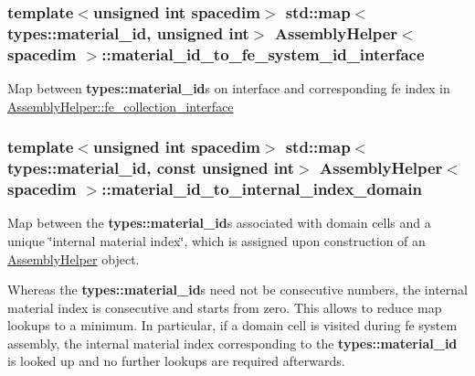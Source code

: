 \subsubsection[{\texorpdfstring{material\+\_\+id\+\_\+to\+\_\+fe\+\_\+system\+\_\+id\+\_\+interface}{material_id_to_fe_system_id_interface}}]{\setlength{\rightskip}{0pt plus 5cm}template$<$unsigned int spacedim$>$ std\+::map$<${\bf types\+::material\+\_\+id}, unsigned int$>$ {\bf Assembly\+Helper}$<$ spacedim $>$\+::material\+\_\+id\+\_\+to\+\_\+fe\+\_\+system\+\_\+id\+\_\+interface\hspace{0.3cm}{\ttfamily [private]}}\hypertarget{class_assembly_helper_a5fea54137e3c1c5a514e39c9b2ad7926}{}\label{class_assembly_helper_a5fea54137e3c1c5a514e39c9b2ad7926}
Map between {\bf types\+::material\+\_\+id}s on interface and corresponding fe index in \hyperlink{class_assembly_helper_a8b4d224a9ecd2e926a8860829874d2a1}{Assembly\+Helper\+::fe\+\_\+collection\+\_\+interface} 
\subsubsection[{\texorpdfstring{material\+\_\+id\+\_\+to\+\_\+internal\+\_\+index\+\_\+domain}{material_id_to_internal_index_domain}}]{\setlength{\rightskip}{0pt plus 5cm}template$<$unsigned int spacedim$>$ std\+::map$<${\bf types\+::material\+\_\+id}, const unsigned int$>$ {\bf Assembly\+Helper}$<$ spacedim $>$\+::material\+\_\+id\+\_\+to\+\_\+internal\+\_\+index\+\_\+domain\hspace{0.3cm}{\ttfamily [private]}}\hypertarget{class_assembly_helper_a10b3acf64bccc169ee14dc2505ce4b46}{}\label{class_assembly_helper_a10b3acf64bccc169ee14dc2505ce4b46}
Map between the {\bf types\+::material\+\_\+id}s associated with domain cells and a unique \char`\"{}internal material index\char`\"{}, which is assigned upon construction of an \hyperlink{class_assembly_helper}{Assembly\+Helper} object.

Whereas the {\bf types\+::material\+\_\+id}s need not be consecutive numbers, the internal material index is consecutive and starts from zero. This allows to reduce map lookups to a minimum. In particular, if a domain cell is visited during fe system assembly, the internal material index corresponding to the {\bf types\+::material\+\_\+id} is looked up and no further lookups are required afterwards. 
